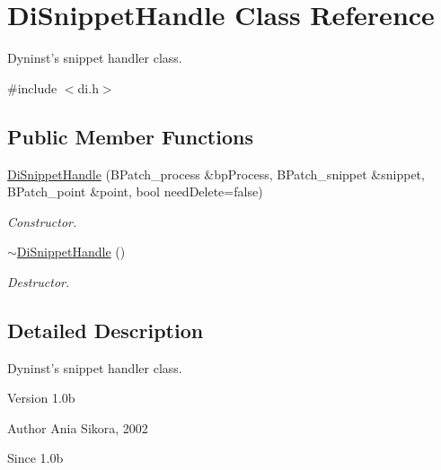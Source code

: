 \hypertarget{class_di_snippet_handle}{\section{Di\-Snippet\-Handle Class Reference}
\label{class_di_snippet_handle}
}


Dyninst's snippet handler class.  




{\ttfamily \#include $<$di.\-h$>$}

\subsection*{Public Member Functions}
\begin{DoxyCompactItemize}
\item 
\hyperlink{class_di_snippet_handle_ad2aa280a58b769d009c1cbf54d8c2afa}{Di\-Snippet\-Handle} (B\-Patch\-\_\-process \&bp\-Process, B\-Patch\-\_\-snippet \&snippet, B\-Patch\-\_\-point \&point, bool need\-Delete=false)
\begin{DoxyCompactList}\small\item\em Constructor. \end{DoxyCompactList}\item 
\hypertarget{class_di_snippet_handle_af4f4526830359aec77237aef3b809d3f}{\hyperlink{class_di_snippet_handle_af4f4526830359aec77237aef3b809d3f}{$\sim$\-Di\-Snippet\-Handle} ()}\label{class_di_snippet_handle_af4f4526830359aec77237aef3b809d3f}

\begin{DoxyCompactList}\small\item\em Destructor. \end{DoxyCompactList}\end{DoxyCompactItemize}


\subsection{Detailed Description}
Dyninst's snippet handler class. 

\begin{DoxyVersion}{Version}
1.\-0b 
\end{DoxyVersion}
\begin{DoxyAuthor}{Author}
Ania Sikora, 2002 
\end{DoxyAuthor}
\begin{DoxySince}{Since}
1.\-0b 
\end{DoxySince}


